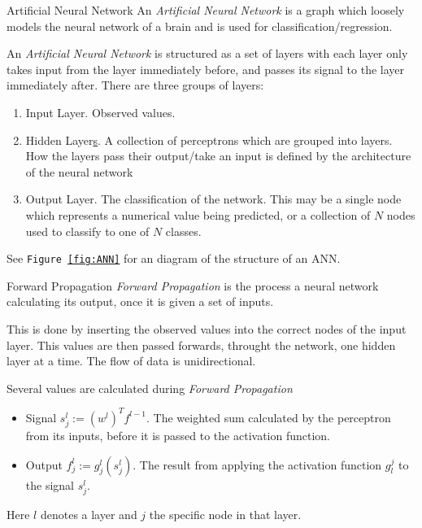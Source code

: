\documentclass[11pt,a4paper]{article}
\begin{document}
  \begin{definition}{Artificial Neural Network}
    An \textit{Artificial Neural Network} is a graph which loosely models the neural network of a brain and is used for classification/regression.
    \par An \textit{Artificial Neural Network} is structured as a set of layers with each layer only takes input from the layer immediately before, and passes its signal to the layer immediately after. There are three groups of layers:
    \begin{enumerate}
      \item Input Layer. Observed values.
      \item Hidden Layer\underline{s}. A collection of perceptrons which are grouped into layers. How the layers pass their output/take an input is defined by the architecture of the neural network
      \item Output Layer. The classification of the network. This may be a single node which represents a numerical value being predicted, or a collection of $N$ nodes used to classify to one of $N$ classes.
    \end{enumerate}
    See \texttt{Figure \ref{fig:ANN}} for an diagram of the structure of an ANN.
  \end{definition}

  \begin{definition}{Forward Propagation}
    \textit{Forward Propagation} is the process a neural network calculating its output, once it is given a set of inputs.
    \par This is done by inserting the observed values into the correct nodes of the input layer. This values are then passed forwards, throught the network, one hidden layer at a time. The flow of data is unidirectional.
    \par Several values are calculated during \textit{Forward Propagation}
    \begin{itemize}
      \item Signal $s_j^l:=(w^l)^Tf^{l-1}$. The weighted sum calculated by the perceptron from its inputs, before it is passed to the activation function.
      \item Output $f_j^l:=g_j^l(s_j^l)$. The result from applying the activation function $g^j_l$ to the signal $s_j^l$.
    \end{itemize}
    Here $l$ denotes a layer and $j$ the specific node in that layer.
  \end{definition}
\end{document}
